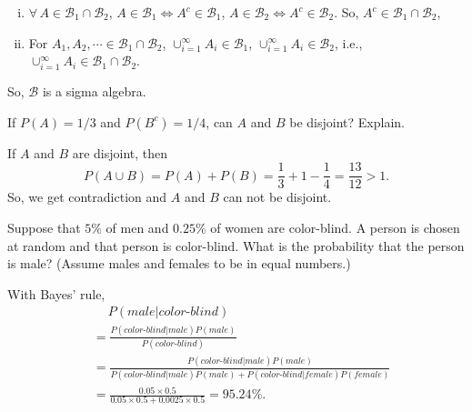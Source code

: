 \documentclass[14pt]{elegantbook}
\begin{document}
\begin{solution}
\begin{enumerate}[(a)]
\begin{enumerate}[(i)]
                \item $\forall\,A\in\mathcal{B}_1\cap\mathcal{B}_2$, $A\in\mathcal{B}_1\Leftrightarrow A^c\in\mathcal{B}_1$, $A\in\mathcal{B}_2\Leftrightarrow A^c\in\mathcal{B}_2$. So, $A^c\in\mathcal{B}_1\cap\mathcal{B}_2$, 
                \item For $A_1, A_2, \cdots \in\mathcal{B}_1\cap\mathcal{B}_2$, $\cup_{i=1}^\infty A_i\in\mathcal{B}_1$, $\cup_{i=1}^\infty A_i\in\mathcal{B}_2$, i.e., $\cup_{i=1}^\infty A_i\in\mathcal{B}_1\cap\mathcal{B}_2$. 
            \end{enumerate}
            So, $\mathcal{B}$ is a sigma algebra. 
        \end{enumerate}
    \end{solution}

    \setcounter{exer}{12}
    \begin{exercise}
        If $P(A)=1/3$ and $P(B^c)=1/4$, can $A$ and $B$ be disjoint? Explain. 
    \end{exercise}

    \begin{solution}
        If $A$ and $B$ are disjoint, then
        \[P(A\cup B)=P(A)+P(B)=\frac{1}{3}+1-\frac{1}{4}=\frac{13}{12}>1. \]
        So, we get contradiction and $A$ and $B$ can not be disjoint. 
    \end{solution}

    \setcounter{exer}{32}
    \begin{exercise}
        Suppose that $5\%$ of men and $0.25\%$ of women are color-blind. A person is chosen at random and that person is color-blind. What is the probability that the person is male? (Assume males and females to be in equal numbers.)
    \end{exercise}

    \begin{solution}
        With Bayes' rule, 
        \begin{align*}
            &\quad \ P(male|color\text{-}blind)\\
            &=\frac{P(color\text{-}blind|male)P(male)}{P(color\text{-}blind)}\\
            &=\frac{P(color\text{-}blind|male)P(male)}{P(color\text{-}blind|male)P(male)+P(color\text{-}blind|female)P(female)}\\
            &=\frac{0.05\times0.5}{0.05\times0.5+0.0025\times0.5}=95.24\%.
        \end{align*}
    \end{solution}
\end{document}
